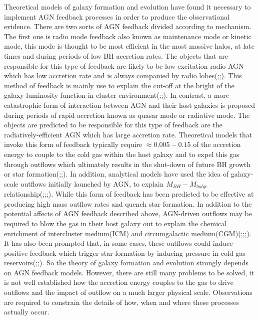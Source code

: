 \documentclass[../main.tex]{subfiles}
\begin{document}
Theoretical models of galaxy formation and evolution have found it necessary to implement AGN feedback processes in order to produce the observational evidence. There are two sorts of AGN feedback divided according to mechanism. The first one is radio mode feedback also known as maintenance mode or kinetic mode, this mode is thought to be most efficient in the most massive halos, at late times and during periods of low BH accretion rates. The objects that are responsible for this type of feedback are likely to be low-excitation radio AGN which has low accretion rate and is always companied by radio lobes(\cite{churazov2005supermassive};\cite{bower2006breaking};\cite{mccarthy2011gas}). This method of feedback is mainly use to explain the cut-off at the bright of the galaxy luminosity function in cluster environment(\cite{bower2006breaking};\cite{croton2006many};\cite{somerville2008semi}). In contrast, a more catastrophic form of interaction between AGN and their host galaxies is proposed during periods of rapid accretion known as quasar mode or radiative mode. The objects are predicted to be responsible for this type of feedback are the radiatively-efficient AGN which has large accretion rate. Theoretical models that invoke this form of feedback typically require $\approx 0.005-0.15$ of the accretion energy to couple to the cold gas within the host galaxy and to expel this gas through outflows which ultimately results in the shut-down of future BH growth or star formation(\cite{benson2003shapes};\cite{hopkins2006normalization};\cite{debuhr2012galaxy}). In addition, analytical models have used the idea of galaxy-scale outflows initially launched by AGN, to explain $M_{BH}-M_{bulge}$ relationship(\cite{fabian1999obscured};\cite{granato2004physical};\cite{king2011large};\cite{faucher2012physics}). While this form of feedback has been predicted to be effective at producing high mass outflow rates and quench star formation. In addition to the potential affects of AGN feedback described above, AGN-driven outflows may be required to blow the gas in their host galaxy out to explain the chemical enrichment of intercluster medium(ICM) and circumgalactic medium(CGM)(\cite{borgani2008chemical};\cite{wiersma2009chemical};\cite{fabjan2010simulating};\cite{ciotti2010feedback}). It has also been prompted that, in some cases, these outflows could induce positive feedback which trigger star formation by inducing pressure in cold gas reservoirs(\cite{nayakshin2012quasar};\cite{ishibashi2012active};\cite{silk2013unleashing}). So the theory of galaxy formation and evolution strongly depends on AGN feedback models. However, there are still many problems to be solved, it is not well established how the accretion energy couples to the gas to drive outflows and the impact of outflow on a much larger physical scale. Observations are required to constrain the details of how, when and where these processes actually occur.
\end{document}
